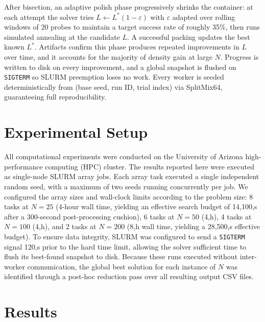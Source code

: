\documentclass[10pt]{article}
\begin{document}
After bisection, an adaptive polish phase progressively shrinks the
container: at each attempt the solver tries $L \leftarrow L^*(1 -
\varepsilon)$ with $\varepsilon$ adapted over rolling windows of 20
probes to maintain a target success rate of roughly 35\%, then runs simulated annealing
at the candidate $L$. A successful packing updates the best known
$L^*$. Artifacts confirm this phase produces repeated improvements in
$L$ over time, and it accounts for the majority of density gain at
large $N$. Progress is written to disk on every improvement, and a
global snapshot is flushed on \texttt{SIGTERM} so SLURM preemption
loses no work. Every worker is seeded deterministically from (base
seed, run ID, trial index) via SplitMix64, guaranteeing full
reproducibility.

\section{Experimental Setup}
\label{sec:experiments}

All computational experiments were conducted on the University of
 Arizona high-performance computing (HPC) cluster.
  The results reported here were executed as single-node SLURM array jobs.
    Each array task executed a single independent random seed,
     with a maximum of two seeds running concurrently per job. 
     We configured the array sizes and wall-clock limits according 
     to the problem size: 8 tasks at $N = 25$ 
     (4-hour wall time, yielding an effective search budget of
      14{,}100,s after a 300-second post-processing cushion),
       6 tasks at $N = 50$ (4,h), 4 tasks at $N = 100$ (4,h),
        and 2 tasks at $N = 200$ (8,h wall time, yielding a
         28{,}500,s effective budget). To ensure data integrity,
          SLURM was configured to send a \texttt{SIGTERM}
           signal 120,s prior to the hard time limit, allowing the solver
            sufficient time to flush its best-found snapshot to disk.
             Because these runs executed without inter-worker communication,
              the global best solution for each instance of $N$
               was identified through
 a post-hoc reduction pass over all resulting output CSV files.
\section{Results}
\label{sec:results}
\end{document}
